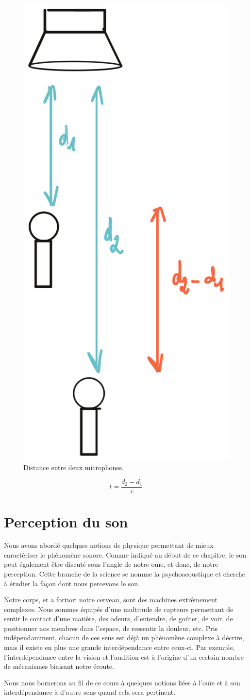 \documentclass[
]{book}
\begin{document}
\begin{figure}

{\centering \includegraphics[width=0.25\linewidth]{_resources/drawings/mic_dist} 

}

\caption{Distance entre deux microphones.}\label{fig:unnamed-chunk-6}
\end{figure}

\[ t = \frac {d_2-d_1}{c}\]

\hypertarget{perception-du-son}{%
\section{Perception du son}\label{perception-du-son}}

Nous avons abordé quelques notions de physique permettant de mieux caractériser le phénomène sonore. Comme indiqué au début de ce chapitre, le son peut également être discuté sous l'angle de notre ouïe, et donc, de notre perception. Cette branche de la science se nomme la psychoacoustique et cherche à étudier la façon dont nous percevons le son.

Notre corps, et a fortiori notre cerveau, sont des machines extrêmement complexes. Nous sommes équipés d'une multitude de capteurs permettant de sentir le contact d'une matière, des odeurs, d'entendre, de goûter, de voir, de positionner nos membres dans l'espace, de ressentir la douleur, etc. Pris indépendamment, chacun de ces sens est déjà un phénomène complexe à décrire, mais il existe en plus une grande interdépendance entre ceux-ci. Par exemple, l'interdépendance entre la vision et l'audition est à l'origine d'un certain nombre de mécanismes biaisant notre écoute.

Nous nous bornerons au fil de ce cours à quelques notions liées à l'ouïe et à son interdépendance à d'autre sens quand cela sera pertinent.
\end{document}
